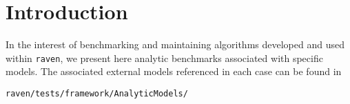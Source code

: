 \section{Introduction}
In the interest of benchmarking and maintaining algorithms developed and used within \texttt{raven}, we
present here analytic benchmarks associated with specific models. The associated external models 
referenced in each case can be found in

\texttt{raven/tests/framework/AnalyticModels/}
